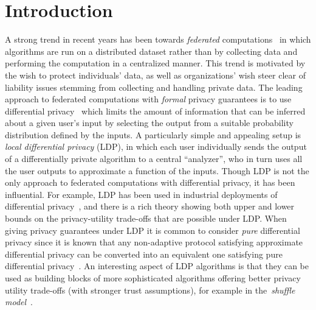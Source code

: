 \section{Introduction}

A strong trend in recent years has been towards \emph{federated} computations~\cite{Kairouz2021advances} in which algorithms are run on a distributed dataset rather than by collecting data and performing the computation in a centralized manner.
This trend is motivated by the wish to protect individuals' data, as well as organizations' wish steer clear of liability issues stemming from collecting and handling private data.
The leading approach to federated computations with \emph{formal} privacy guarantees is to use differential privacy~\cite{dwork2006calibrating} which limits the amount of information that can be inferred about a given user's input by selecting the output from a suitable probability distribution defined by the inputs.
A particularly simple and appealing setup is \emph{local differential privacy} (LDP), in which each user individually sends the output of a differentially private algorithm to a central ``analyzer'', who in turn uses all the user outputs to approximate a function of the inputs.
Though LDP is not the only approach to federated computations with differential privacy, it has been influential. 
For example, LDP has been used in industrial deployments of differential privacy~\cite{cormode2018privacy,Erlingsson2014rappor,apple2017differential}, and there is a rich theory showing both upper and lower bounds on the privacy-utility trade-offs that are possible under LDP.
When giving privacy guarantees under LDP it is common to consider \emph{pure} differential privacy since it is known that any non-adaptive protocol satisfying approximate differential privacy can be converted into an equivalent one satisfying pure differential privacy~\cite{bun2019heavy}.
An interesting aspect of LDP algorithms is that they can be used as building blocks of more sophisticated algorithms offering better privacy utility trade-offs (with stronger trust assumptions), for example in the~\emph{shuffle model}~\cite{bittau2017prochlo, cheu2018distributed,erlingsson2019amplification}.

